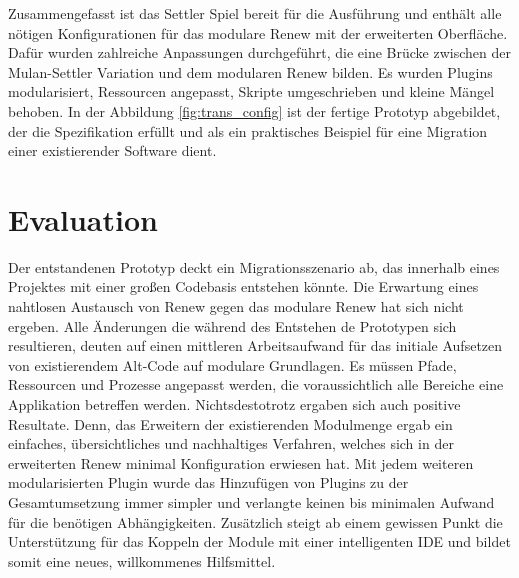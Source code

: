 	Zusammengefasst ist das Settler Spiel bereit für die Ausführung und enthält alle nötigen Konfigurationen für das modulare Renew mit der erweiterten Oberfläche. Dafür wurden zahlreiche Anpassungen durchgeführt, die eine Brücke zwischen der Mulan-Settler Variation und dem modularen Renew bilden. Es wurden Plugins modularisiert, Ressourcen angepasst, Skripte umgeschrieben und kleine Mängel behoben. \newline
	In der Abbildung \ref{fig:trans_config} ist der fertige Prototyp abgebildet, der die Spezifikation erfüllt und als ein praktisches Beispiel für eine Migration einer existierender Software dient. 

\section{Evaluation}
	Der entstandenen Prototyp deckt ein Migrationsszenario ab, das innerhalb eines Projektes mit einer großen Codebasis entstehen könnte. Die Erwartung eines nahtlosen Austausch von Renew gegen das modulare Renew hat sich nicht ergeben. Alle Änderungen die während des Entstehen de Prototypen sich resultieren, deuten auf einen mittleren Arbeitsaufwand für das initiale Aufsetzen von existierendem Alt-Code auf modulare Grundlagen. Es müssen Pfade, Ressourcen und Prozesse angepasst werden, die voraussichtlich alle Bereiche eine Applikation betreffen werden.\newline
	Nichtsdestotrotz ergaben sich auch positive Resultate. Denn, das Erweitern der existierenden Modulmenge ergab ein einfaches, übersichtliches und nachhaltiges Verfahren, welches sich in der erweiterten Renew minimal Konfiguration erwiesen hat. Mit jedem weiteren modularisierten Plugin wurde das Hinzufügen von Plugins zu der Gesamtumsetzung immer simpler und verlangte keinen bis minimalen Aufwand für die benötigen Abhängigkeiten. Zusätzlich steigt ab einem gewissen Punkt die Unterstützung für das Koppeln der Module mit einer intelligenten IDE und bildet somit eine neues, willkommenes Hilfsmittel.
